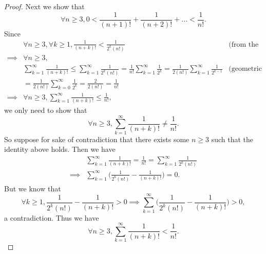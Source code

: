 \begin{proof}
    Next we show that
    \[
        \forall n \geq 3, 0 < \frac{1}{(n + 1)!} + \frac{1}{(n + 2)!} + \dots < \frac{1}{n!}.
    \]
    Since
    \begin{align*}
                 & \forall n \geq 3, \forall k \geq 1, \frac{1}{(n + k)!} < \frac{1}{2^k (n!)}                                                                                                                    & \text{(from the proof above)} \\
        \implies & \forall n \geq 3,                                                                                                                                                                                                              \\
                 & \sum_{k = 1}^\infty \frac{1}{(n + k)!} \leq \sum_{k = 1}^\infty \frac{1}{2^k (n!)} = \frac{1}{n!} \sum_{k = 1}^\infty \frac{1}{2^k} = \frac{1}{2 (n!)} \sum_{k = 1}^\infty \frac{1}{2^{k - 1}} & \text{(geometric series)}     \\
                 & = \frac{1}{2 (n!)} \sum_{k = 0}^\infty \frac{1}{2^k} = \frac{2}{2 (n!)} = \frac{1}{n!}                                                                                                                                         \\
        \implies & \forall n \geq 3, \sum_{k = 1}^\infty \frac{1}{(n + k)!} \leq \frac{1}{n!},
    \end{align*}
    we only need to show that
    \[
        \forall n \geq 3, \sum_{k = 1}^\infty \frac{1}{(n + k)!} \neq \frac{1}{n!}.
    \]
    So suppose for sake of contradiction that there exists some \(n \geq 3\) such that the identity above holds.
    Then we have
    \begin{align*}
                 & \sum_{k = 1}^\infty \frac{1}{(n + k)!} = \frac{1}{n!} = \sum_{k = 1}^\infty \frac{1}{2^k (n!)} \\
        \implies & \sum_{k = 1}^\infty \bigg(\frac{1}{2^k (n!)} - \frac{1}{(n + k)!}\bigg) = 0.
    \end{align*}
    But we know that
    \[
        \forall k \geq 1, \frac{1}{2^k (n!)} - \frac{1}{(n + k)!} > 0 \implies \sum_{k = 1}^\infty \bigg(\frac{1}{2^k (n!)} - \frac{1}{(n + k)!}\bigg) > 0,
    \]
    a contradiction.
    Thus we have
    \[
        \forall n \geq 3, \sum_{k = 1}^\infty \frac{1}{(n + k)!} < \frac{1}{n!}.
    \]


\end{proof}
